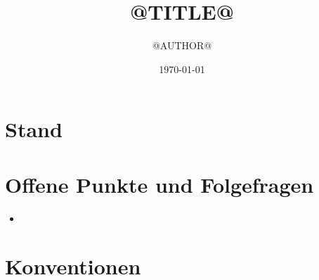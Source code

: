 \documentclass[11pt,a4paper]{article}
\title{@TITLE@}
\author{@AUTHOR@}
\date{\today}
\begin{document}
\maketitle

\section*{Stand}

\berryoverview

%


\section*{Offene Punkte und Folgefragen}
\begin{itemize}
  \item %
\end{itemize}


\appendix
\section{Konventionen}
\berryconventions
\end{document}

